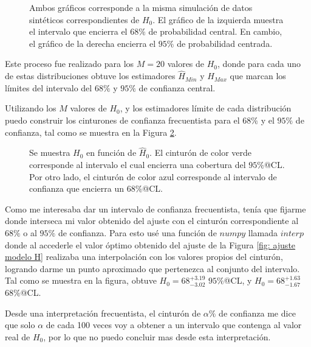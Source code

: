 \documentclass[]{article}
\begin{document}
\begin{figure}[H]
    \centering
    \captionsetup{justification=centering}
    \captionsetup{font=footnotesize}
    \caption{Ambos gráficos corresponde a la misma simulación de datos sintéticos correspondientes de $H_0$. El gráfico de la izquierda muestra el intervalo que encierra el
    $68\%$ de probabilidad central. En cambio, el gráfico de la derecha encierra el $95\%$ de probabilidad centrada.}
    \label{fig: histograma_h0}
\end{figure}

Este proceso fue realizado para los $M = 20$ valores de $H_0$, donde para cada uno de estas distribuciones obtuve los estimadores $\hat{H}_{Min}$ y $\hat{H}_{Max}$ que marcan los límites
del intervalo del $68\%$ y $95\%$ de confianza central.

Utilizando los $M$ valores de $H_0$, y los estimadores límite de cada distribución puedo construir los cinturones de confianza frecuentista para el $68\%$ y el $95\%$ de confianza, tal
como se muestra en la Figura \ref{fig: cinturon_frecuentista}.

\begin{figure}[H]
    \centering
    \captionsetup{justification=centering}
    \captionsetup{font=footnotesize}
    \caption{Se muestra $H_0$ en función de $\hat{H}_0$. El cinturón de color verde corresponde al intervalo el cual encierra una cobertura del $95\%$@CL. 
    Por otro lado, el cinturón de color azul corresponde al intervalo de confianza que encierra un $68\%$@CL.}
    \label{fig: cinturon_frecuentista}
\end{figure}

Como me interesaba dar un intervalo de confianza frecuentista, tenía que fijarme donde interseca mi valor obtenido del ajuste con el cinturón correspondiente al $68\%$ o al $95\%$ de 
confianza. Para esto usé una función de $numpy$ llamada $interp$ donde al accederle el valor óptimo obtenido del ajuste de la Figura \ref{fig: ajuste modelo H} realizaba una 
interpolación con los valores propios del cinturón, logrando darme un punto aproximado que pertenezca al conjunto del intervalo. Tal como se muestra en la figura, 
obtuve $H_0 = 68_{-3.02}^{+3.19}$ $95\%$@CL, y $H_0 = 68_{-1.67}^{+1.63}$ $68\%$@CL.

Desde una interpretación frecuentista, el cinturón de $\alpha\%$ de confianza me dice que solo $\alpha$ de cada 100 veces voy a obtener a un intervalo que
contenga al valor real de $H_0$, por lo que no puedo concluir mas desde esta interpretación.
\end{document}
